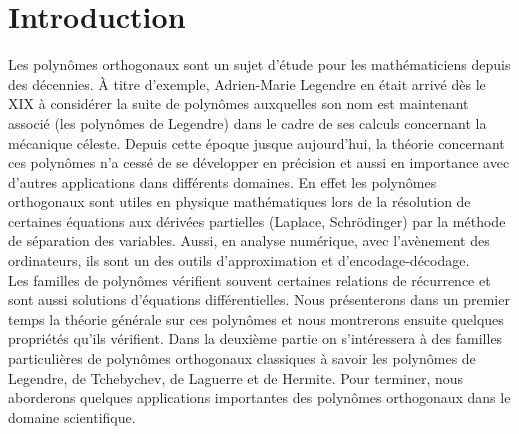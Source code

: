 \chapter{Introduction}
Les polynômes orthogonaux sont un sujet d'étude pour les mathématiciens depuis des décennies. \`{A} titre d'exemple, Adrien-Marie Legendre en était arrivé dès le XIX à considérer la suite de polynômes auxquelles son nom est maintenant associé (les polynômes de Legendre) dans le cadre de ses calculs concernant la mécanique céleste. Depuis cette époque jusque aujourd'hui, la théorie concernant ces polynômes n'a cessé de se développer en précision et aussi en importance avec d'autres applications dans différents domaines. En effet les polynômes orthogonaux sont utiles en physique mathématiques lors de la résolution de certaines équations aux dérivées partielles (Laplace, Schrödinger) par la méthode de séparation des variables. Aussi, en analyse numérique, avec l'avènement des ordinateurs, ils sont un des outils d'approximation et d'encodage-décodage. 
\\Les familles de polynômes vérifient souvent certaines relations de récurrence et sont aussi solutions d'équations différentielles. Nous présenterons dans un premier temps la théorie générale sur ces polynômes et nous montrerons ensuite quelques propriétés qu'ils vérifient. Dans la deuxième partie on s'intéressera à des familles particulières de polynômes orthogonaux classiques à savoir les polynômes de Legendre, de Tchebychev, de Laguerre et de Hermite. Pour terminer, nous aborderons quelques applications importantes des polynômes orthogonaux dans le domaine scientifique.
